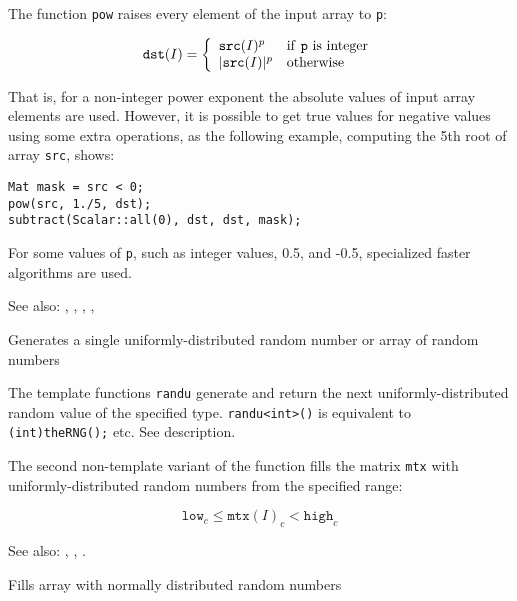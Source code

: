 The function \texttt{pow} raises every element of the input array to \texttt{p}:

\[
\texttt{dst}(I) = \left\{ \begin{array}{l l} \texttt{src}(I)^p & \mbox{if \texttt{p} is integer}\\ |\texttt{src}(I)|^p & \mbox{otherwise}\\ \end{array} \right.
\]

That is, for a non-integer power exponent the absolute values of input array elements are used. However, it is possible to get true values for negative values using some extra operations, as the following example, computing the 5th root of array \texttt{src}, shows:

\begin{lstlisting}
Mat mask = src < 0;
pow(src, 1./5, dst);
subtract(Scalar::all(0), dst, dst, mask);
\end{lstlisting}

For some values of \texttt{p}, such as integer values, 0.5, and -0.5, specialized faster algorithms are used.

See also: , , , , 

Generates a single uniformly-distributed random number or array of random numbers

\begin{description}
\end{description}

The template functions \texttt{randu} generate and return the next uniformly-distributed random value of the specified type. \texttt{randu<int>()} is equivalent to \texttt{(int)theRNG();} etc. See  description.

The second non-template variant of the function fills the matrix \texttt{mtx} with uniformly-distributed random numbers from the specified range:

\[\texttt{low}_c \leq \texttt{mtx}(I)_c < \texttt{high}_c\]

See also: , , .

Fills array with normally distributed random numbers

